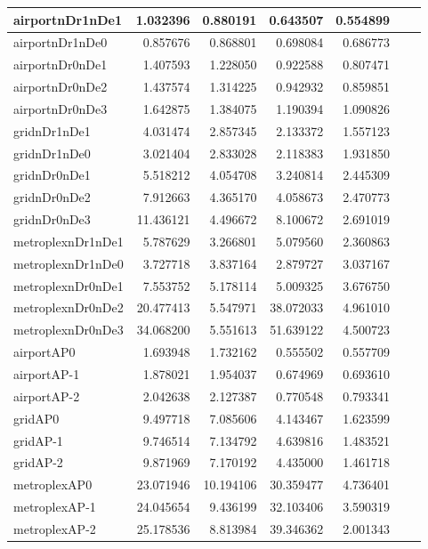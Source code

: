 \begin{longtable}{|l|r|r|r|r|r|r|}
\endlastfoot
airportnDr1nDe1 & 1.032396 & 0.880191 & 0.643507 & 0.554899 \\ \hline
airportnDr1nDe0 & 0.857676 & 0.868801 & 0.698084 & 0.686773 \\ \hline
airportnDr0nDe1 & 1.407593 & 1.228050 & 0.922588 & 0.807471 \\ \hline
airportnDr0nDe2 & 1.437574 & 1.314225 & 0.942932 & 0.859851 \\ \hline
airportnDr0nDe3 & 1.642875 & 1.384075 & 1.190394 & 1.090826 \\ \hline
gridnDr1nDe1 & 4.031474 & 2.857345 & 2.133372 & 1.557123 \\ \hline
gridnDr1nDe0 & 3.021404 & 2.833028 & 2.118383 & 1.931850 \\ \hline
gridnDr0nDe1 & 5.518212 & 4.054708 & 3.240814 & 2.445309 \\ \hline
gridnDr0nDe2 & 7.912663 & 4.365170 & 4.058673 & 2.470773 \\ \hline
gridnDr0nDe3 & 11.436121 & 4.496672 & 8.100672 & 2.691019 \\ \hline
metroplexnDr1nDe1 & 5.787629 & 3.266801 & 5.079560 & 2.360863 \\ \hline
metroplexnDr1nDe0 & 3.727718 & 3.837164 & 2.879727 & 3.037167 \\ \hline
metroplexnDr0nDe1 & 7.553752 & 5.178114 & 5.009325 & 3.676750 \\ \hline
metroplexnDr0nDe2 & 20.477413 & 5.547971 & 38.072033 & 4.961010 \\ \hline
metroplexnDr0nDe3 & 34.068200 & 5.551613 & 51.639122 & 4.500723 \\ \hline
airportAP0 & 1.693948 & 1.732162 & 0.555502 & 0.557709 \\ \hline
airportAP-1 & 1.878021 & 1.954037 & 0.674969 & 0.693610 \\ \hline
airportAP-2 & 2.042638 & 2.127387 & 0.770548 & 0.793341 \\ \hline
gridAP0 & 9.497718 & 7.085606 & 4.143467 & 1.623599 \\ \hline
gridAP-1 & 9.746514 & 7.134792 & 4.639816 & 1.483521 \\ \hline
gridAP-2 & 9.871969 & 7.170192 & 4.435000 & 1.461718 \\ \hline
metroplexAP0 & 23.071946 & 10.194106 & 30.359477 & 4.736401 \\ \hline
metroplexAP-1 & 24.045654 & 9.436199 & 32.103406 & 3.590319 \\ \hline
metroplexAP-2 & 25.178536 & 8.813984 & 39.346362 & 2.001343 \\ \hline

\end{longtable}
